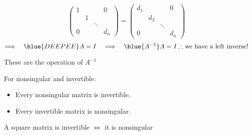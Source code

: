 \begin{answer}
\begin{enumerate}[$\arabic*^\circ$]
\[\begin{pmatrix}
                1 & & & 0\\
                 & 1 & & \\
                 & & \ddots & \\
                0 & & & d_n
            \end{pmatrix} = \begin{pmatrix}
                d_1 & & & 0\\
                 & d_2 & & \\
                 & & \ddots & \\
                0 & & & d_n
            \end{pmatrix}
        \]
        \[
        \Longrightarrow \quad \blue{DEEPEE}A = I \quad \Longrightarrow \quad \blue{A^{-1}} A = I \therefore \text{we have a left inverse!} 
        \]
    \end{enumerate}

    These are the operation of $A^{-1}$
\end{answer}

\begin{theorem}
    For nonsingular and invertible:
    \begin{itemize}
        \item Every nonsingular matrix is invertible.
        \item Every invertible matrix is nonsingular.
    \end{itemize}
\end{theorem}

\begin{theorem}
    A square matrix is invertible $\Longleftrightarrow$ it is nonsingular
\end{theorem}